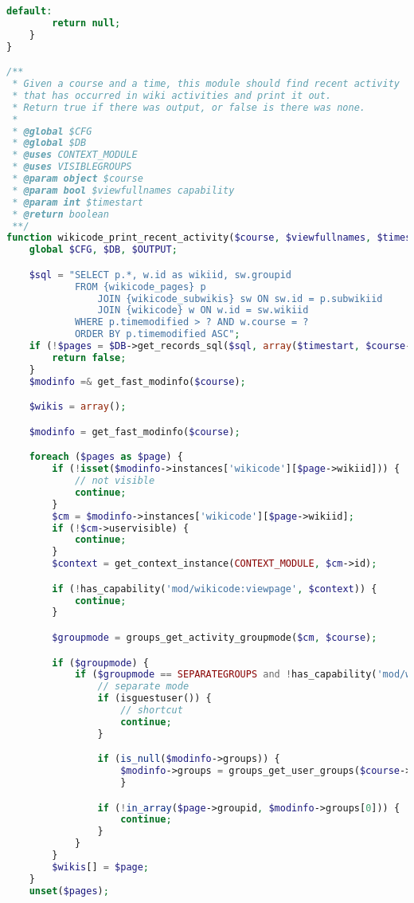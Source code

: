 \begin{lstlisting}[language=PHP]
    default:
        return null;
    }
}

/**
 * Given a course and a time, this module should find recent activity
 * that has occurred in wiki activities and print it out.
 * Return true if there was output, or false is there was none.
 *
 * @global $CFG
 * @global $DB
 * @uses CONTEXT_MODULE
 * @uses VISIBLEGROUPS
 * @param object $course
 * @param bool $viewfullnames capability
 * @param int $timestart
 * @return boolean
 **/
function wikicode_print_recent_activity($course, $viewfullnames, $timestart) {
    global $CFG, $DB, $OUTPUT;

    $sql = "SELECT p.*, w.id as wikiid, sw.groupid
            FROM {wikicode_pages} p
                JOIN {wikicode_subwikis} sw ON sw.id = p.subwikiid
                JOIN {wikicode} w ON w.id = sw.wikiid
            WHERE p.timemodified > ? AND w.course = ?
            ORDER BY p.timemodified ASC";
    if (!$pages = $DB->get_records_sql($sql, array($timestart, $course->id))) {
        return false;
    }
    $modinfo =& get_fast_modinfo($course);

    $wikis = array();

    $modinfo = get_fast_modinfo($course);

    foreach ($pages as $page) {
        if (!isset($modinfo->instances['wikicode'][$page->wikiid])) {
            // not visible
            continue;
        }
        $cm = $modinfo->instances['wikicode'][$page->wikiid];
        if (!$cm->uservisible) {
            continue;
        }
        $context = get_context_instance(CONTEXT_MODULE, $cm->id);

        if (!has_capability('mod/wikicode:viewpage', $context)) {
            continue;
        }

        $groupmode = groups_get_activity_groupmode($cm, $course);

        if ($groupmode) {
            if ($groupmode == SEPARATEGROUPS and !has_capability('mod/wikicode:managewiki', $context)) {
                // separate mode
                if (isguestuser()) {
                    // shortcut
                    continue;
                }

                if (is_null($modinfo->groups)) {
                    $modinfo->groups = groups_get_user_groups($course->id); // load all my groups and cache it in modinfo
                    }

                if (!in_array($page->groupid, $modinfo->groups[0])) {
                    continue;
                }
            }
        }
        $wikis[] = $page;
    }
    unset($pages);


\end{lstlisting}
